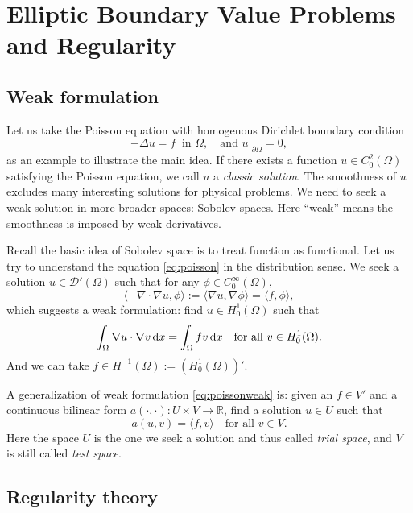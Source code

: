 \section{Elliptic Boundary Value Problems and Regularity}

\subsection{Weak formulation}
Let us take the Poisson equation with homogenous Dirichlet
boundary condition
\begin{equation}\label{eq:poisson}
-\Delta u=f\;\; \textrm{in }\Omega, \quad \textrm{and } u|_{\partial\Omega}=0,
\end{equation}
as an example to illustrate the main idea. If there exists a function $u\in C_0^2(\Omega)$
satisfying the Poisson equation, we call $u$ a {\it classic solution}. The smoothness of $u$ excludes
many interesting solutions for physical problems. We need to seek a weak solution in more
broader spaces: Sobolev spaces. Here ``weak'' means the smoothness is imposed by weak
derivatives.

Recall the basic idea of Sobolev space is to treat function as functional. Let us try to
understand the equation \eqref{eq:poisson} in the distribution sense. We seek a solution $u\in \mathcal D'(\Omega)$ such
that for any $\phi\in C_0^{\infty}(\Omega)$,
\[
\langle-\nabla\cdot\nabla u,\phi\rangle:=\langle\nabla u,\nabla\phi\rangle=\langle f, \phi\rangle,
\]
which suggests a weak formulation: find $u\in H_0^1(\Omega)$ such that
\begin{equation}\label{eq:poissonweak}
\int_{\Omega}\nabla u\cdot\nabla v\,{\rm d}x=\int_{\Omega}f v\,{\rm d}x\quad\textrm{for all } v\in H_0^1(\Omega).
\end{equation}
And we can take $f\in H^{-1}(\Omega):=(H_0^1(\Omega))'$.

A generalization of weak formulation \eqref{eq:poissonweak} is: given an $f\in V'$ and a continuous bilinear form $a(\cdot, \cdot): U\times V\to \mathbb R$,  find a solution $u\in U$ such that
\begin{equation*}
a(u, v)=\langle f, v\rangle\quad\textrm{for all } v\in V.
\end{equation*}
Here the space $U$ is the one we seek a solution and thus called {\it trial space}, and $V$ is still
called {\it test space}.


\subsection{Regularity theory}

